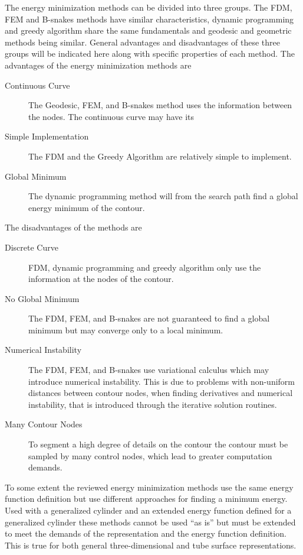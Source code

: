 The energy minimization methods can be divided into three groups. The
FDM, FEM and B-snakes methods have similar characteristics, dynamic
programming and greedy algorithm share the same fundamentals and 
geodesic and geometric methods being similar. General advantages and
disadvantages of these three groups will be indicated here along with
specific properties of each method. The advantages of the energy
minimization methods are
\begin{description}
\item[Continuous Curve] The Geodesic, FEM, and B-snakes method uses the
  information between the nodes. The continuous curve may have its 

\item[Simple Implementation] The FDM and the Greedy Algorithm are
  relatively simple to implement.

\item[Global Minimum] The dynamic programming method will from the
  search path find a global energy minimum of the contour.
\end{description}
The disadvantages of the methods are
\begin{description}
\item[Discrete Curve] FDM, dynamic programming and greedy algorithm
  only use the information at the nodes of the contour.

\item[No Global Minimum] The FDM, FEM, and B-snakes are not guaranteed
  to find a global minimum but may converge only to a local minimum.
  
\item[Numerical Instability] The FDM, FEM, and B-snakes use
  variational calculus which may introduce numerical instability. This
  is due to problems with non-uniform distances between contour nodes,
  when finding derivatives and numerical instability, that is
  introduced through the iterative solution routines.

\item[Many Contour Nodes] To segment a high degree of details on the
  contour the contour must be sampled by many control nodes, which
  lead to greater computation demands.
\end{description}
To some extent the reviewed energy minimization methods use the same
energy function definition but use different approaches for finding a
minimum energy. Used with a generalized cylinder and an extended
energy function defined for a generalized cylinder these methods
cannot be used ``as is'' but must be extended to meet the demands of
the representation and the energy function definition. This is true
for both general three-dimensional and tube surface representations.




\clearemptydoublepage

